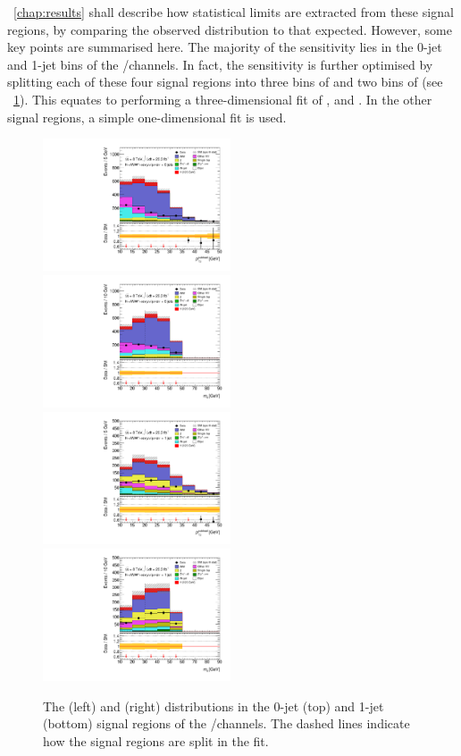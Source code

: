 \Chapter~\ref{chap:results} shall describe how statistical limits are extracted from these 
signal regions, by comparing the observed \mt distribution to that expected. However, some 
key points are summarised here. The majority of the sensitivity lies in the 0-jet and 1-jet 
bins of the \emch/\mech channels. In fact, the sensitivity is further optimised by splitting 
each of these four signal regions into three bins of \ptsubleadlep and two bins of \mll 
(see \Figure~\ref{fig:sel:df_split_sr}). This equates to performing a three-dimensional fit 
of \mt, \mll and \ptsubleadlep. In the other signal regions, a simple one-dimensional \mt 
fit is used.

\begin{figure}[p]
	\includegraphics[width=0.495\textwidth]{tex/selection/emme_CutFRecoil_0jet_lepPtSublead_zoom_mh125_lin}
	\hfill
	\includegraphics[width=0.495\textwidth]{tex/selection/emme_CutFRecoil_0jet_Mll_zoom_mh125_lin}
	\\
	\includegraphics[width=0.495\textwidth]{tex/selection/emme_CutFRecoil_1jet_lepPtSublead_zoom_mh125_lin}
	\hfill
	\includegraphics[width=0.495\textwidth]{tex/selection/emme_CutFRecoil_1jet_Mll_zoom_mh125_lin}
	\caption{The \ptsubleadlep (left) and \mll (right) distributions in the 0-jet (top) and 
	1-jet (bottom) signal regions of the \emch/\mech channels. The dashed lines indicate 
	how the signal regions are split in the fit.}
	\label{fig:sel:df_split_sr}
\end{figure}


